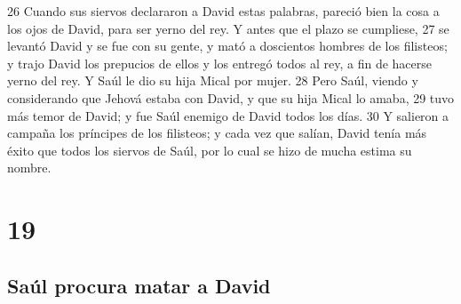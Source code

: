 26 Cuando sus siervos declararon a David estas palabras, pareció bien la cosa a los ojos de David, para ser yerno del rey. Y antes que el plazo se cumpliese,
27 se levantó David y se fue con su gente, y mató a doscientos hombres de los filisteos; y trajo David los prepucios de ellos y los entregó todos al rey, a fin de hacerse yerno del rey. Y Saúl le dio su hija Mical por mujer.
28 Pero Saúl, viendo y considerando que Jehová estaba con David, y que su hija Mical lo amaba,
29 tuvo más temor de David; y fue Saúl enemigo de David todos los días.
30 Y salieron a campaña los príncipes de los filisteos; y cada vez que salían, David tenía más éxito que todos los siervos de Saúl, por lo cual se hizo de mucha estima su nombre.

\chapter{19}

\section*{Saúl procura matar a David}


